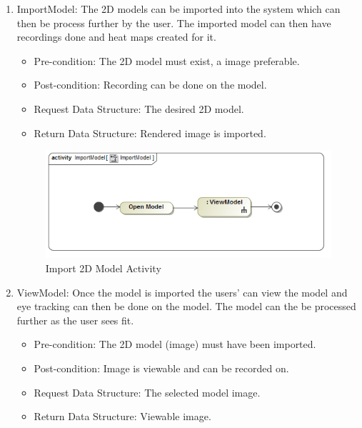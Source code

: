 	\begin{enumerate}
		\item{ImportModel:}
		\newline
		The 2D models can be imported into the system which can then be process further by the user. The imported model can then have recordings done and heat maps created for it. 
		\begin{itemize}
			\item Pre-condition: The 2D model must exist, a image preferable.
			\item Post-condition: Recording can be done on the model.
			\item Request Data Structure: The desired 2D model.
			\item Return Data Structure: Rendered image is imported.
		\end{itemize}
		
		\begin{figure}[!ht]
			\centering
			\includegraphics[scale=0.5,width=15cm,keepaspectratio]{Diagrams/Activity_Diagram__ImportModel__ImportModel.png}
			\caption{Import 2D Model Activity}
		\end{figure}
	
		\item{ViewModel:}
		Once the model is imported the users' can view the model and eye tracking can then be done on the model. The model can the be processed further as the user sees fit.
		\begin{itemize}
			\item Pre-condition: The 2D model (image) must have been imported.
			\item Post-condition: Image is viewable and can be recorded on.
			\item Request Data Structure: The selected model image.
			\item Return Data Structure: Viewable image.
		\end{itemize}
		

\end{enumerate}
